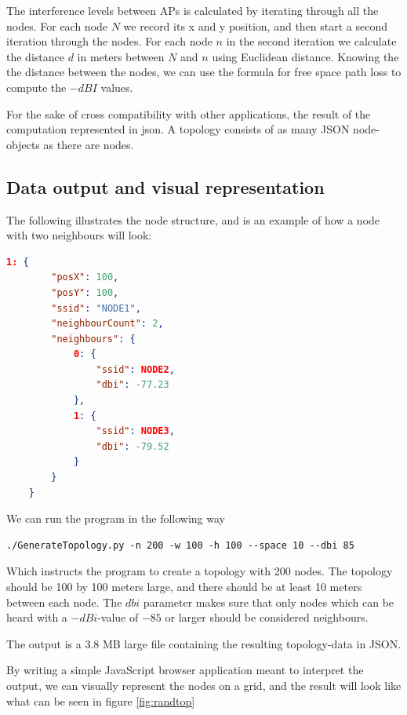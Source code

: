 \documentclass[a4paper,UKenglish]{report}
\begin{document}
The interference levels between APs is calculated by iterating through all the nodes. For each node $N$ we record its x and y position,
and then start a second iteration through the nodes. For each node $n$ in the second iteration we calculate the distance $d$ in
meters between $N$ and $n$ using Euclidean distance. Knowing the the distance between the nodes,  we can use the formula for free space path loss \cite{FSPL} to compute the $-dBI$ values.

For the sake of cross compatibility with other applications, the result of the computation represented in json. A topology consists of as
many JSON node-objects as there are nodes.


\subsection{Data output and visual representation} \label{simulationrep}
The following illustrates the node structure, and is an example of how a node with two neighbours will look: 

\begin{minipage}{\linewidth}
	\begin{lstlisting}[language=json]
	1: {
		"posX": 100,
		"posY": 100, 
		"ssid": "NODE1",
		"neighbourCount": 2, 
		"neighbours": {
			0: {
				"ssid": NODE2,
				"dbi": -77.23
			},
			1: {
				"ssid": NODE3,
				"dbi": -79.52
			}
		}
	}
	\end{lstlisting}
\end{minipage}

We can run the program in the following way
\begin{verbatim}./GenerateTopology.py -n 200 -w 100 -h 100 --space 10 --dbi 85 \end{verbatim}
Which instructs the program to create a topology with 200 nodes. 
The topology should be 100 by 100 meters large, and there should be at least 10 meters
between each node. The $dbi$ parameter makes sure that only nodes which can be
heard with a $-dBi$-value of $-85$ or larger should be considered neighbours.

The output is a 3.8 MB large file containing the resulting topology-data in JSON.

By writing a simple JavaScript browser application meant to interpret the output, we can
visually represent the nodes on a grid, and the result will look like what can be seen in figure \ref{fig:randtop}
\end{document}
